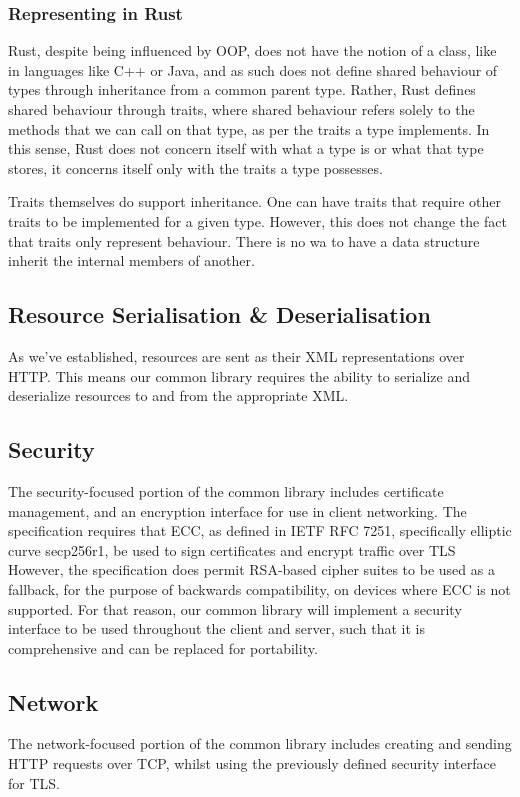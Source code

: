 \subsubsection{Representing in Rust}
Rust, despite being influenced by OOP, does not have the notion of a class, like in languages like C++ or Java, and as such does not define shared behaviour of types through inheritance from a common parent type. 
Rather, Rust defines shared behaviour through traits, where shared behaviour refers solely to the methods that we can call on that type, as per the traits a type implements.
In this sense, Rust does not concern itself with what a type is or what that type stores, it concerns itself only with the traits a type possesses.

Traits themselves do support inheritance. One can have traits that require other traits to be implemented for a given type. However, this does not change the fact that traits only represent behaviour. 
There is no wa to have a data structure inherit the internal members of another.






\subsection{Resource Serialisation \& Deserialisation}
As we've established, resources are sent as their XML representations over HTTP. This means our common library requires the ability to serialize and deserialize resources to and from the appropriate XML.


\subsection{Security}
The security-focused portion of the common library includes certificate management, and an encryption interface for use in client networking.
The specification requires that ECC, as defined in IETF RFC 7251, specifically elliptic curve secp256r1, be used to sign certificates and encrypt traffic over TLS 
However, the specification does permit RSA-based cipher suites to be used as a fallback, for the purpose of backwards compatibility, on devices where ECC is not supported.
For that reason, our common library will implement a security interface to be used throughout the client and server, such that it is comprehensive and can be replaced for portability.
\subsection{Network}
The network-focused portion of the common library includes creating and sending HTTP requests over TCP, whilst using the previously defined security interface for TLS.


